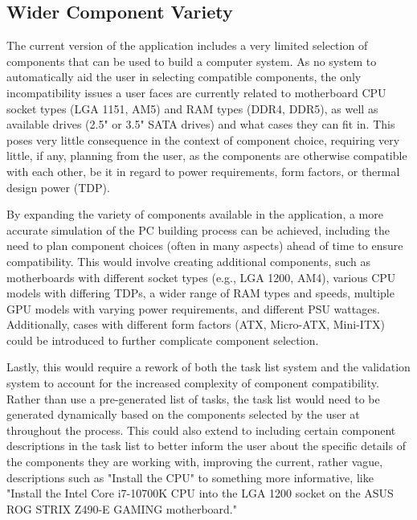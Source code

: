 \subsection{Wider Component Variety}
\label{sec:WiderComponentVariety}

The current version of the application includes a very limited selection of components that can be used to build a computer system.
As no system to automatically aid the user in selecting compatible components, the only incompatibility issues a user faces are currently related to motherboard CPU socket types (LGA 1151, AM5) and RAM types (DDR4, DDR5), as well as available drives (2.5" or 3.5" SATA drives) and what cases they can fit in.
This poses very little consequence in the context of component choice, requiring very little, if any, planning from the user, as the components are otherwise compatible with each other, be it in regard to power requirements, form factors, or thermal design power (TDP).

By expanding the variety of components available in the application, a more accurate simulation of the PC building process can be achieved, including the need to plan component choices (often in many aspects) ahead of time to ensure compatibility.
This would involve creating additional components, such as motherboards with different socket types (e.g., LGA 1200, AM4), various CPU models with differing TDPs, a wider range of RAM types and speeds, multiple GPU models with varying power requirements, and different PSU wattages.
Additionally, cases with different form factors (ATX, Micro-ATX, Mini-ITX) could be introduced to further complicate component selection.

Lastly, this would require a rework of both the task list system and the validation system to account for the increased complexity of component compatibility.
Rather than use a pre-generated list of tasks, the task list would need to be generated dynamically based on the components selected by the user at throughout the process.
This could also extend to including certain component descriptions in the task list to better inform the user about the specific details of the components they are working with, improving the current, rather vague, descriptions such as "Install the CPU" to something more informative, like "Install the Intel Core i7-10700K CPU into the LGA 1200 socket on the ASUS ROG STRIX Z490-E GAMING motherboard."